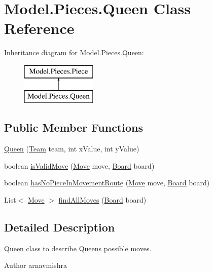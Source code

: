\hypertarget{class_model_1_1_pieces_1_1_queen}{}\section{Model.\+Pieces.\+Queen Class Reference}
\label{class_model_1_1_pieces_1_1_queen}
Inheritance diagram for Model.\+Pieces.\+Queen\+:\begin{figure}[H]
\begin{center}
\leavevmode
\includegraphics[height=2.000000cm]{class_model_1_1_pieces_1_1_queen}
\end{center}
\end{figure}
\subsection*{Public Member Functions}
\begin{DoxyCompactItemize}
\item 
\hyperlink{class_model_1_1_pieces_1_1_queen_a975dd0d19b30fa943f53e3b8d23a5114}{Queen} (\hyperlink{class_model_1_1_team}{Team} team, int x\+Value, int y\+Value)
\item 
boolean \hyperlink{class_model_1_1_pieces_1_1_queen_a60af220d259d96efdc25e940774fd804}{is\+Valid\+Move} (\hyperlink{class_model_1_1_move}{Move} move, \hyperlink{class_model_1_1_board}{Board} board)
\item 
boolean \hyperlink{class_model_1_1_pieces_1_1_queen_a816cf5f71e321e7a084999db678a01c5}{has\+No\+Piece\+In\+Movement\+Route} (\hyperlink{class_model_1_1_move}{Move} move, \hyperlink{class_model_1_1_board}{Board} board)
\item 
List$<$ \hyperlink{class_model_1_1_move}{Move} $>$ \hyperlink{class_model_1_1_pieces_1_1_queen_ae9cfa3e4e5ebd735f18aed1f66cce4c7}{find\+All\+Moves} (\hyperlink{class_model_1_1_board}{Board} board)
\end{DoxyCompactItemize}


\subsection{Detailed Description}
\hyperlink{class_model_1_1_pieces_1_1_queen}{Queen} class to describe \hyperlink{class_model_1_1_pieces_1_1_queen}{Queen}\textquotesingle{}s possible moves. \begin{DoxyAuthor}{Author}
arnavmishra 
\end{DoxyAuthor}


